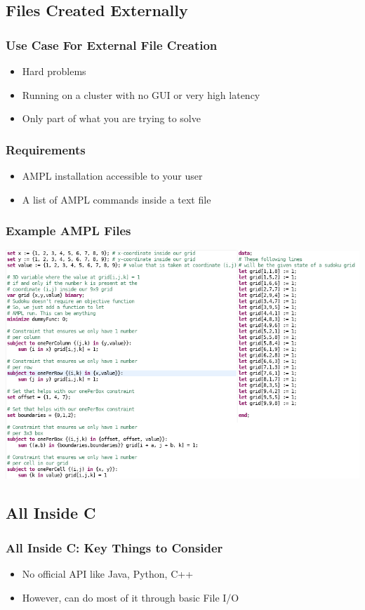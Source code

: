 \documentclass{beamer}
\begin{document}
    \subsection{Files Created Externally}
    \begin{frame}
        \frametitle{Use Case For External File Creation}
        \begin{itemize}
            \item Hard problems
            \item Running on a cluster with no GUI or very high latency
            \item Only part of what you are trying to solve
        \end{itemize}
    \end{frame}
    \begin{frame}
        \frametitle{Requirements}
        \begin{itemize}
            \item AMPL installation accessible to your user
            \item A list of AMPL commands inside a text file
        \end{itemize}
    \end{frame}
    \begin{frame}
        \frametitle{Example AMPL Files}
        \includegraphics[width=.9\textwidth]{figures/presentationFile.png}
   \end{frame}
   \begin{frame}
   \end{frame}
    \subsection{All Inside C}
    \begin{frame}
        \frametitle{All Inside C: Key Things to Consider}
        \begin{itemize}
            \item No official API like Java, Python, C++
            \item However, can do most of it through basic File I/O
        \end{itemize}
    \end{frame}
    \begin{frame}
        \frametitle{Example C File
    \end{frame}
\end{document}
